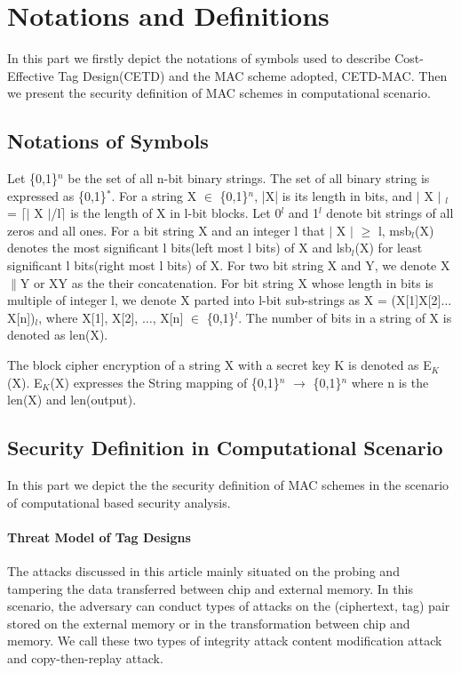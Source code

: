 \documentclass{article}
\begin{document}

\printnomenclature
\section{Notations and Definitions}
In this part we firstly depict the notations of symbols used to describe Cost-Effective Tag Design(CETD) and the MAC scheme adopted, CETD-MAC. Then we present the security definition of MAC schemes in computational scenario.
\subsection{Notations of Symbols}
Let \{0,1\}$^n$ be the set of all n-bit binary strings.  The set of all binary string is expressed as \{0,1\}$^*$.  
For a string X $\in$ \{0,1\}$^n$, |X| is its length in bits, and $\vert$ X $\vert$ $_l$ = $\lceil$$\vert$ X $\vert$/l$\rceil$ is the length of X in l-bit blocks.  Let 0$^l$ and 1$^l$ denote bit strings of all zeros and all ones. 
For a bit string X and an integer l that $\vert$ X $\vert$ $\geq$ l, msb$_l$(X) denotes the most significant l bits(left most l bits) of X and lsb$_l$(X) for least significant l bits(right most l bits) of X.
For two bit string X and Y, we denote X$\|$Y  or XY as the their concatenation. For bit string X whose length in bits is multiple of integer l, we denote X parted into l-bit sub-strings as X = (X[1]X[2]$\ldots$X[n])$_l$, where X[1], X[2], $\ldots$, X[n] $\in$ \{0,1\}$^l$.
The number of bits in a string of X is denoted as len(X).

The block cipher encryption of a string X with a secret key K is denoted as E$_K$(X). E$_K$(X) expresses the String mapping of \{0,1\}$^n$ $\rightarrow$ \{0,1\}$^n$ where n is the len(X) and len(output).

\subsection{Security Definition in Computational Scenario}
In this part we depict the the security definition of MAC schemes in the scenario of computational based security analysis. 
\paragraph{Threat Model of Tag Designs}
The attacks discussed in this article mainly situated on the probing and
tampering the data transferred between chip and external memory. In this scenario, the adversary can conduct types of attacks on the (ciphertext, tag) pair stored on the external memory or in the transformation between chip and memory. We call these two types of integrity attack content modification attack and copy-then-replay attack. 
\end{document}
